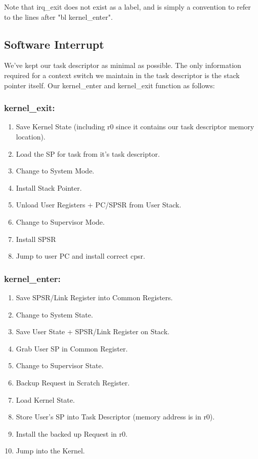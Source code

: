 \documentclass{article}
\begin{document}
Note that irq\_exit does not exist as a label, and is simply a convention to refer to the lines after "bl kernel\_enter".

\subsection{Software Interrupt}

We've kept our task descriptor as minimal as possible. The only information required for a context switch we maintain in the task descriptor is the stack pointer itself. Our kernel\_enter and kernel\_exit function as follows:

\subsubsection{kernel\_exit:}
\begin{enumerate}
    \item Save Kernel State (including r0 since it contains our task descriptor memory location).
    \item Load the SP for task from it's task descriptor.
    \item Change to System Mode. 
    \item Install Stack Pointer.
    \item Unload User Registers + PC/SPSR from User Stack.
    \item Change to Supervisor Mode.
    \item Install SPSR
    \item Jump to user PC and install correct cpsr.
\end{enumerate}

\subsubsection{kernel\_enter:}
\begin{enumerate}
   \item Save SPSR/Link Register into Common Registers.
   \item Change to System State.
   \item Save User State + SPSR/Link Register on Stack.
   \item Grab User SP in Common Register.
   \item Change to Supervisor State.
   \item Backup Request in Scratch Register.
   \item Load Kernel State.
   \item Store User's SP into Task Descriptor (memory address is in r0).
   \item Install the backed up Request in r0.
   \item Jump into the Kernel.
\end{enumerate}
\end{document}
